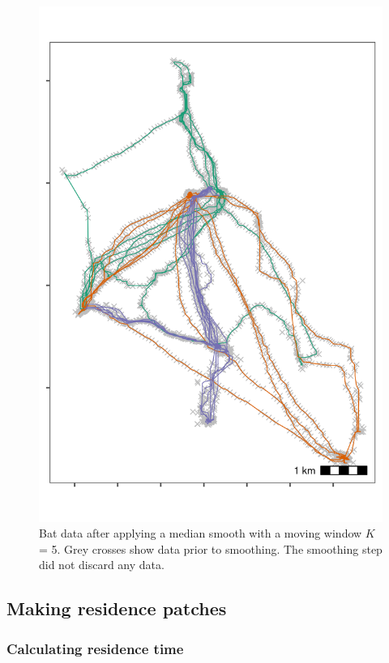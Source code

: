 \documentclass[]{scrartcl}
\begin{document}
\begin{figure}
\centering
\includegraphics{figures/fig_bat_smooth.png}
\caption{Bat data after applying a median smooth with a moving window \(K\) = 5. Grey crosses show data prior to smoothing. The smoothing step did not discard any data.}
\end{figure}

\hypertarget{making-residence-patches}{%
\subsection{Making residence patches}\label{making-residence-patches}}

\hypertarget{calculating-residence-time}{%
\subsubsection{Calculating residence time}\label{calculating-residence-time}}
\end{document}
